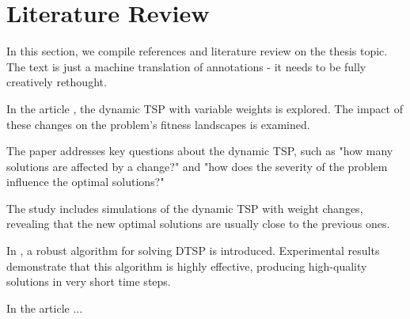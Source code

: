 \chapter{Literature Review}

{\color{red} In this section, we compile references and literature review on the thesis topic. The text is just a machine translation of annotations - it needs to be fully creatively rethought. }

In the article \cite{Tinos2015}, the dynamic TSP with variable weights is explored. The impact of these changes on the problem's fitness landscapes is examined.

The paper addresses key questions about the dynamic TSP, such as "how many solutions are affected by a change?" and "how does the severity of the problem influence the optimal solutions?"

The study includes simulations of the dynamic TSP with weight changes, revealing that the new optimal solutions are usually close to the previous ones.

In \cite{10.1007/11903697_31}, a robust algorithm for solving DTSP is introduced. Experimental results demonstrate that this algorithm is highly effective, producing high-quality solutions in very short time steps.

In the article \cite{Gharehchopogh2012} ... 

